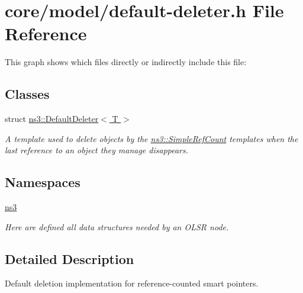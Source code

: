 \hypertarget{default-deleter_8h}{}\section{core/model/default-\/deleter.h File Reference}
\label{default-deleter_8h}
This graph shows which files directly or indirectly include this file\+:
\subsection*{Classes}
\begin{DoxyCompactItemize}
\item 
struct \hyperlink{structns3_1_1DefaultDeleter}{ns3\+::\+Default\+Deleter$<$ T $>$}
\begin{DoxyCompactList}\small\item\em A template used to delete objects by the \hyperlink{classns3_1_1SimpleRefCount}{ns3\+::\+Simple\+Ref\+Count} templates when the last reference to an object they manage disappears. \end{DoxyCompactList}\end{DoxyCompactItemize}
\subsection*{Namespaces}
\begin{DoxyCompactItemize}
\item 
 \hyperlink{namespacens3}{ns3}
\begin{DoxyCompactList}\small\item\em Here are defined all data structures needed by an O\+L\+SR node. \end{DoxyCompactList}\end{DoxyCompactItemize}


\subsection{Detailed Description}
Default deletion implementation for reference-\/counted smart pointers. 